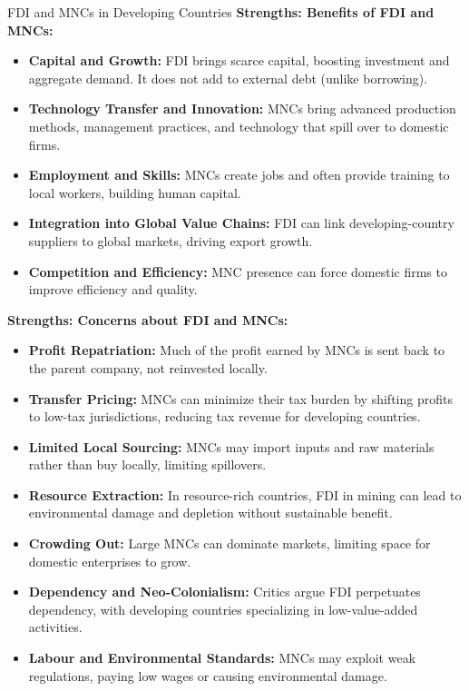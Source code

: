 \documentclass[11pt, a4paper, twoside]{book}
\begin{document}
\begin{evaluation}{FDI and MNCs in Developing Countries}
\textbf{Strengths: Benefits of FDI and MNCs:}
\begin{itemize}
  \item \textbf{Capital and Growth:} FDI brings scarce capital, boosting investment and aggregate demand. It does not add to external debt (unlike borrowing).
  \item \textbf{Technology Transfer and Innovation:} MNCs bring advanced production methods, management practices, and technology that spill over to domestic firms.
  \item \textbf{Employment and Skills:} MNCs create jobs and often provide training to local workers, building human capital.
  \item \textbf{Integration into Global Value Chains:} FDI can link developing-country suppliers to global markets, driving export growth.
  \item \textbf{Competition and Efficiency:} MNC presence can force domestic firms to improve efficiency and quality.
\end{itemize}

\textbf{Strengths: Concerns about FDI and MNCs:}
\begin{itemize}
  \item \textbf{Profit Repatriation:} Much of the profit earned by MNCs is sent back to the parent company, not reinvested locally.
  \item \textbf{Transfer Pricing:} MNCs can minimize their tax burden by shifting profits to low-tax jurisdictions, reducing tax revenue for developing countries.
  \item \textbf{Limited Local Sourcing:} MNCs may import inputs and raw materials rather than buy locally, limiting spillovers.
  \item \textbf{Resource Extraction:} In resource-rich countries, FDI in mining can lead to environmental damage and depletion without sustainable benefit.
  \item \textbf{Crowding Out:} Large MNCs can dominate markets, limiting space for domestic enterprises to grow.
  \item \textbf{Dependency and Neo-Colonialism:} Critics argue FDI perpetuates dependency, with developing countries specializing in low-value-added activities.
  \item \textbf{Labour and Environmental Standards:} MNCs may exploit weak regulations, paying low wages or causing environmental damage.
\end{itemize}


\end{evaluation}
\end{document}
